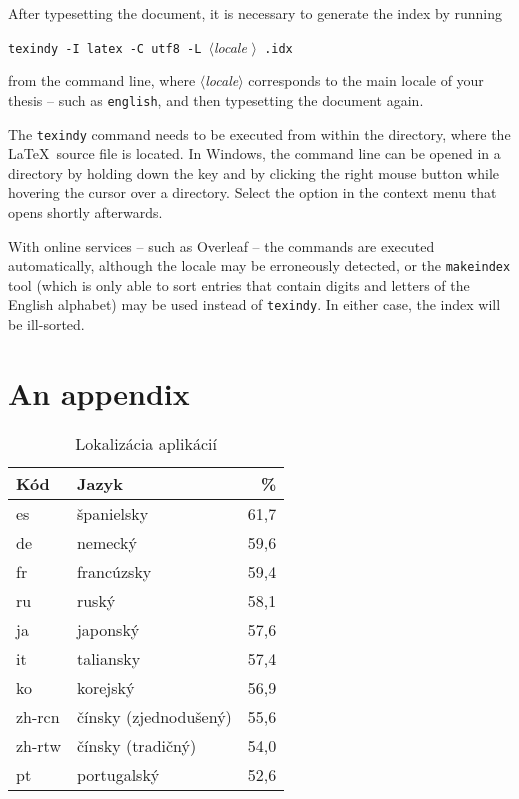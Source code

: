 \documentclass[
  digital, %
  table,   %
  lof,     %
  lot,     %
]{fithesis3}
\begin{document}
After typesetting the document, it is necessary to generate the
index by running
\begin{center}%
  \texttt{texindy -I latex -C utf8 -L }$\langle$\textit{locale}%
  $\rangle$\texttt{ \jobname.idx}
\end{center}
from the command line, where $\langle$\textit{locale}$\rangle$
corresponds to the main locale of your thesis -- such as
\texttt{english}, and then typesetting the document again.

The \texttt{texindy} command needs to be executed from within the
directory, where the \LaTeX\ source file is located. In Windows,
the command line can be opened in a directory by holding down the
 key and by clicking the right mouse button while
hovering the cursor over a directory. Select the  option in the context menu that opens shortly
afterwards.

With online services -- such as Overleaf -- the commands are
executed automatically, although the locale may be erroneously
detected, or the \texttt{makeindex} tool (which is only able to
sort entries that contain digits and letters of the English
alphabet) may be used instead of \texttt{texindy}. In either case,
the index will be ill-sorted.

{} %
\printindex

\appendix %
\chapter{An appendix}
\begin{table}[htb]
\centering
  \begin{tabular}{|l l r|}
    \hline
    Kód & Jazyk &  \% \\\hline\hline
    es & španielsky & 61,7 \\
    de & nemecký & 59,6 \\
    fr & francúzsky & 59,4 \\
    ru & ruský & 58,1 \\
    ja & japonský & 57,6 \\
    it & taliansky & 57,4 \\
	ko & korejský & 56,9 \\
	zh-rcn & čínsky (zjednodušený) & 55,6\\
	zh-rtw & čínsky (tradičný)& 54,0\\
	pt & portugalský & 52,6\\
    \hline
  \end{tabular}
  \caption{Lokalizácia aplikácií}
  \label{tab:language}
\end{table}
\end{document}
